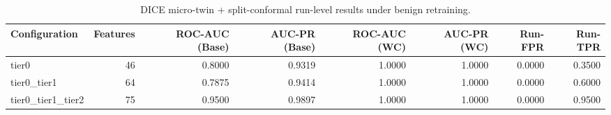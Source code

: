 \begin{table}[t]
\centering
\caption{DICE micro-twin + split-conformal run-level results under benign retraining.}
\label{tab:dice_full_overall}
\footnotesize
\begin{tabular}{lrrrrrrr}
\toprule
Configuration & Features & ROC-AUC (Base) & AUC-PR (Base) & ROC-AUC (WC) & AUC-PR (WC) & Run-FPR & Run-TPR \\
\midrule
tier0 & 46 & 0.8000 & 0.9319 & 1.0000 & 1.0000 & 0.0000 & 0.3500 \\
tier0_tier1 & 64 & 0.7875 & 0.9414 & 1.0000 & 1.0000 & 0.0000 & 0.6000 \\
tier0_tier1_tier2 & 75 & 0.9500 & 0.9897 & 1.0000 & 1.0000 & 0.0000 & 0.9500 \\
\bottomrule
\end{tabular}

\end{table}
